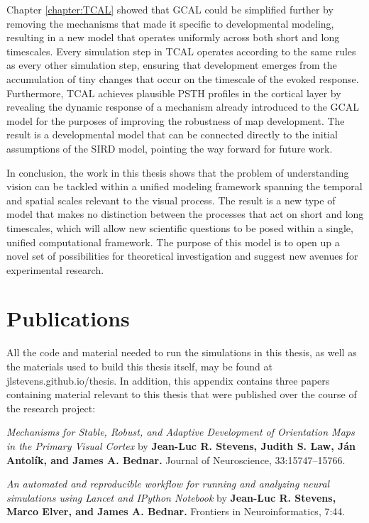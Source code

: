 \documentclass[phd,ianc,twoside]{infthesis}
\begin{document}
Chapter \ref{chapter:TCAL} showed that GCAL could be simplified further
by removing the mechanisms that made it specific to developmental
modeling, resulting in a new model that operates uniformly across both
short and long timescales. Every simulation step in TCAL operates
according to the same rules as every other simulation step, ensuring
that development emerges from the accumulation of tiny changes that
occur on the timescale of the evoked response. Furthermore, TCAL
achieves plausible PSTH profiles in the cortical layer by revealing the
dynamic response of a mechanism already introduced to the GCAL model for
the purposes of improving the robustness of map development. The result
is a developmental model that can be connected directly to the initial
assumptions of the SIRD model, pointing the way forward for future work.

In conclusion, the work in this thesis shows that the problem of
understanding vision can be tackled within a unified modeling framework
spanning the temporal and spatial scales relevant to the visual
process. The result is a new type of model that makes no distinction
between the processes that act on short and long timescales, which will
allow new scientific questions to be posed within a single, unified
computational framework. The purpose of this model is to open up a novel
set of possibilities for theoretical investigation and suggest new avenues
for experimental research.

\appendix
\chapter{Publications}

All the code and material needed to run the simulations in this thesis,
as well as the materials used to build this thesis itself, may be found
at \textsf{jlstevens.github.io/thesis}. In addition, this appendix
contains three papers containing material relevant to this thesis that
were published over the course of the research project:

\vspace{3em}

\emph{Mechanisms for Stable, Robust, and Adaptive Development of Orientation Maps in the Primary Visual Cortex} by {\bf Jean-Luc R. Stevens, Judith S. Law, J\'{a}n Antol\'{i}k, and James A. Bednar.}  Journal of Neuroscience, 33:15747–15766.

\vspace{2em}

\emph{An automated and reproducible workflow for running and analyzing neural simulations using Lancet and IPython Notebook} by {\bf Jean-Luc R. Stevens, Marco Elver, and James A. Bednar.}  Frontiers in Neuroinformatics, 7:44.
\end{document}
